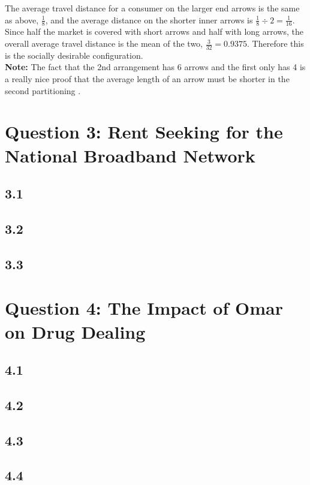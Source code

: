 \documentclass{article}
\begin{document}
\noindent The average travel distance for a consumer on the larger end arrows is the same as above, $\frac{1}{8}$, and the average distance on the shorter inner arrows is $\frac{1}{8} \div 2 = \frac{1}{16}$. Since half the market is covered with short arrows and half with long arrows, the overall average travel distance is the mean of the two, $\frac{3}{32} = 0.9375$. Therefore this is the socially desirable configuration.\\[2mm]
\textbf{Note:} The fact that the 2nd arrangement has 6 arrows and the first only has 4 is a really nice proof that the average length of an arrow must be shorter in the second partitioning \smiley{}.


\section*{Question 3: Rent Seeking for the National Broadband Network}
\subsection*{3.1}
\subsection*{3.2}
\subsection*{3.3}

\section*{Question 4: The Impact of Omar on Drug Dealing}
\subsection*{4.1}
\subsection*{4.2}
\subsection*{4.3}
\subsection*{4.4}
\end{document}
